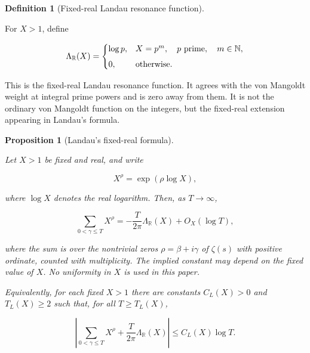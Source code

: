 \documentclass[11pt]{amsart}
\numberwithin{equation}{section}
\theoremstyle{plain}
\newtheorem{proposition}[theorem]{Proposition}
\theoremstyle{definition}
\newtheorem{definition}[theorem]{Definition}
\theoremstyle{remark}
\begin{document}
\begin{definition}[Fixed-real Landau resonance function]
\label{def:fixed_real_landau_resonance_function}

For \(X>1\), define

\begin{equation}
\Lambda_{\mathbb R}(X)
=
\begin{cases}
\log p,
&
X=p^m,\quad p\ {\rm prime},\quad m\in\mathbb N,\\[4pt]
0,
&
\text{otherwise}.
\end{cases}
\label{eq:fixed_real_landau_resonance_function}
\end{equation}

This is the fixed-real Landau resonance function. It agrees with the von
Mangoldt weight at integral prime powers and is zero away from them. It
is not the ordinary von Mangoldt function on the integers, but the
fixed-real extension appearing in Landau's formula.

\end{definition}

\begin{proposition}[Landau's fixed-real formula]
\label{prop:landau_fixed_real_formula}

Let \(X>1\) be fixed and real, and write

\begin{equation}
X^\rho
=
\exp(\rho\log X),
\label{eq:fixed_real_power_convention}
\end{equation}

where \(\log X\) denotes the real logarithm. Then, as \(T\to\infty\),

\begin{equation}
\sum_{0<\gamma\le T}
X^\rho
=
-
\frac{T}{2\pi}
\Lambda_{\mathbb R}(X)
+
O_X(\log T),
\label{eq:landau_fixed_real_formula}
\end{equation}

where the sum is over the nontrivial zeros \(\rho=\beta+i\gamma\) of
\(\zeta(s)\) with positive ordinate, counted with multiplicity. The
implied constant may depend on the fixed value of \(X\). No uniformity in
\(X\) is used in this paper.

Equivalently, for each fixed \(X>1\) there are constants \(C_L(X)>0\)
and \(T_L(X)\ge2\) such that, for all \(T\ge T_L(X)\),

\begin{equation}
\left|
\sum_{0<\gamma\le T}
X^\rho
+
\frac{T}{2\pi}
\Lambda_{\mathbb R}(X)
\right|
\le
C_L(X)\log T.
\label{eq:landau_fixed_real_formula_quantitative}
\end{equation}

\end{proposition}
\end{document}
